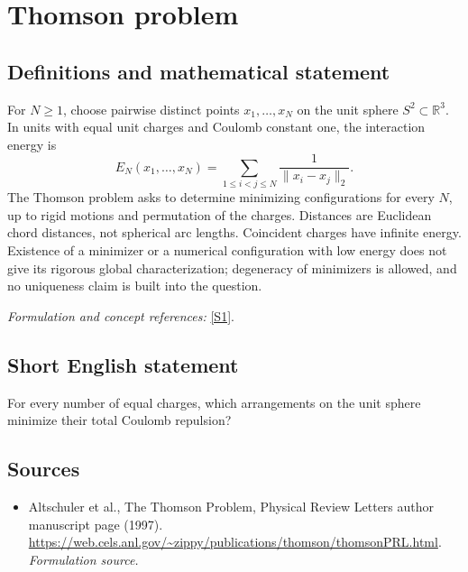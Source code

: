 \documentclass[11pt]{article}
\begin{document}
\section*{\texorpdfstring{Thomson problem}{Thomson problem}}\label{391}
\subsection{Definitions and mathematical statement}
For $N\ge1$, choose pairwise distinct points $x_1,\ldots,x_N$ on the unit sphere $S^2\subset{\mathbb{R}}^3$. In units with equal unit charges and Coulomb constant one, the interaction energy is
\[
 E_N(x_1,\ldots,x_N)=\sum_{1\le i<j\le N}\frac1{\|x_i-x_j\|_2}.
\]
The Thomson problem asks to determine minimizing configurations for every $N$, up to rigid motions and permutation of the charges. Distances are Euclidean chord distances, not spherical arc lengths. Coincident charges have infinite energy. Existence of a minimizer or a numerical configuration with low energy does not give its rigorous global characterization; degeneracy of minimizers is allowed, and no uniqueness claim is built into the question.
\par\smallskip\textit{Formulation and concept references:} \href{https://web.cels.anl.gov/~zippy/publications/thomson/thomsonPRL.html}{[S1]}.

\subsection{Short English statement}
For every number of equal charges, which arrangements on the unit sphere minimize their total Coulomb repulsion?
\subsection{Sources}
\begin{itemize}
\item[S1]Altschuler et al., The Thomson Problem, Physical Review Letters author manuscript page (1997).
\url{https://web.cels.anl.gov/~zippy/publications/thomson/thomsonPRL.html}.
\textit{Formulation source.}
\end{itemize}
\end{document}
